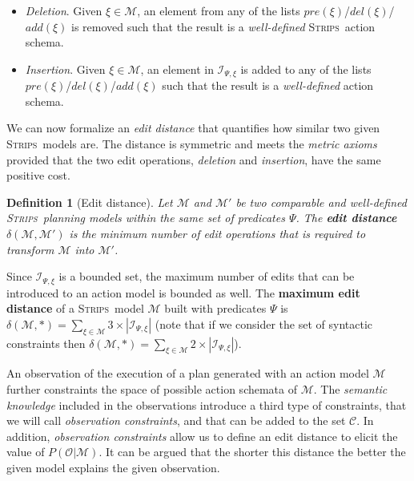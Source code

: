 \documentclass[letterpaper]{article} %
\newcommand{\strips}{\textsc{Strips}}     %
\newtheorem{definition}[theorem]{Definition}
\begin{document}
\begin{itemize}
\item {\em Deletion}. Given $\xi\in\mathcal{M}$, an element from any of the lists $pre(\xi)$/$del(\xi)$/$add(\xi)$ is removed such that the result is a {\em well-defined} \strips\ action schema.
\item {\em Insertion}. Given $\xi\in\mathcal{M}$, an element in ${\mathcal I}_{\Psi,\xi}$ is added to any of the lists $pre(\xi)$/$del(\xi)$/$add(\xi)$ such that the result is a {\em well-defined} action schema.
\end{itemize}

We can now formalize an {\em edit distance} that quantifies how similar two given \strips\ models are. The distance is symmetric and meets the {\em metric axioms} provided that the two edit operations, {\em deletion} and {\em insertion}, have the same positive cost.

\begin{definition}[Edit distance]
  Let $\mathcal{M}$ and $\mathcal{M}'$ be two {\em comparable} and {\em well-defined} \strips\ planning models within the same set of predicates $\Psi$. The {\bf edit distance} $\delta(\mathcal{M},\mathcal{M}')$ is the minimum number of {\em edit operations} that is required to transform $\mathcal{M}$ into $\mathcal{M}'$.
\end{definition}

Since ${\mathcal I}_{\Psi,\xi}$ is a bounded set, the maximum number of edits that can be introduced to an action model is bounded as well. The \textbf{maximum edit distance} of a \strips\ model $\mathcal{M}$ built with predicates $\Psi$ is $\delta(\mathcal{M},*)=\sum_{\xi\in\mathcal{M}} 3\times|{\mathcal I}_{\Psi,\xi}|$ (note that if we consider the set of syntactic constraints then $\delta(\mathcal{M},*)=\sum_{\xi\in\mathcal{M}} 2\times|{\mathcal I}_{\Psi,\xi}|$).

\vspace{0.02cm}

An observation of the execution of a plan generated with an action model $\mathcal{M}$ further constraints the space of possible action schemata of $\mathcal{M}$. The \emph{semantic knowledge} included in the observations introduce a third type of constraints, that we will call {\em observation constraints}, and that can be added to the set $\mathcal{C}$. In addition, {\em observation constraints} allow us to define an edit distance to elicit the value of $P(\mathcal{O}|\mathcal{M})$. It can be argued that the shorter this distance the better the given model explains the given observation.
\end{document}
